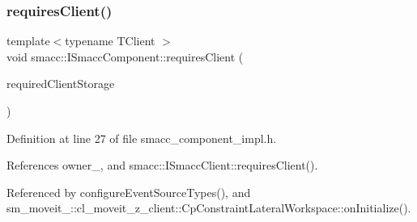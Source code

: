 \mbox{\label{classsmacc_1_1ISmaccComponent_a36c085d906fbae0fcaee817aaeafebf4}} 
\subsubsection{\texorpdfstring{requires\+Client()}{requiresClient()}}
{\footnotesize\ttfamily template$<$typename T\+Client $>$ \\
void smacc\+::\+I\+Smacc\+Component\+::requires\+Client (\begin{DoxyParamCaption}\item[{\hyperlink{classTClient}{T\+Client} $\ast$\&}]{required\+Client\+Storage }\end{DoxyParamCaption})\hspace{0.3cm}{\ttfamily [protected]}}



Definition at line 27 of file smacc\+\_\+component\+\_\+impl.\+h.



References owner\+\_\+, and smacc\+::\+I\+Smacc\+Client\+::requires\+Client().



Referenced by configure\+Event\+Source\+Types(), and sm\+\_\+moveit\+\_\+::cl\+\_\+moveit\+\_\+z\+\_\+client\+::\+Cp\+Constraint\+Lateral\+Workspace\+::on\+Initialize().


